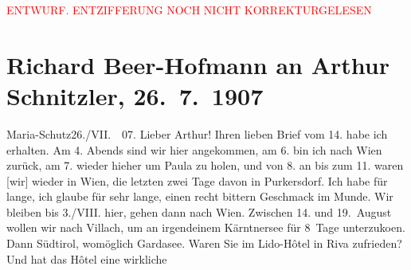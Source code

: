 
\begin{center}
            \textcolor{red}{ENTWURF. ENTZIFFERUNG NOCH NICHT KORREKTURGELESEN}
                      \end{center}
            
               \section[Richard Beer-Hofmann an Arthur Schnitzler, 26. 7. 1907]{ Richard Beer-Hofmann an Arthur Schnitzler,
               26. 7. 1907}\nopagebreak{}\rehead{ }\begin{ledgroupsized}[t]{13cm}\normalsize\beginnumbering{} \toendnotes[C]{\smallbreak\pagebreak[2]} 
\pstart
           \raggedleft{}{\pb}Maria-Schutz26./VII.  07.\pend
           \pstart
           Lieber Arthur! Ihren lieben Brief vom 14. habe ich
               erhalten. Am 4. Abends sind wir hier angekommen, am 6. bin
               ich nach Wien zurück, am 7. wieder
               hieher um Paula zu holen, und von 8.
               an bis zum 11. waren {[}wir{]} wieder in Wien, die letzten zwei Tage davon in Purkersdorf. Ich habe für lange, ich glaube für sehr lange,
               einen recht bittern Geschmack im Munde.\pend
           \pstart
           Wir bleiben bis 3./VIII. hier, gehen dann nach Wien. Zwischen 14. und 19. August
               wollen wir {\pb}nach Villach, um an irgendeinem Kärntnersee für 8 Tage unterzuko{\geminationm}en. Dann Südtirol, womöglich Gardasee. Waren Sie im Lido-Hôtel in Riva zufrieden? Und hat das Hôtel eine wirkliche

\end{ledgroupsized}
